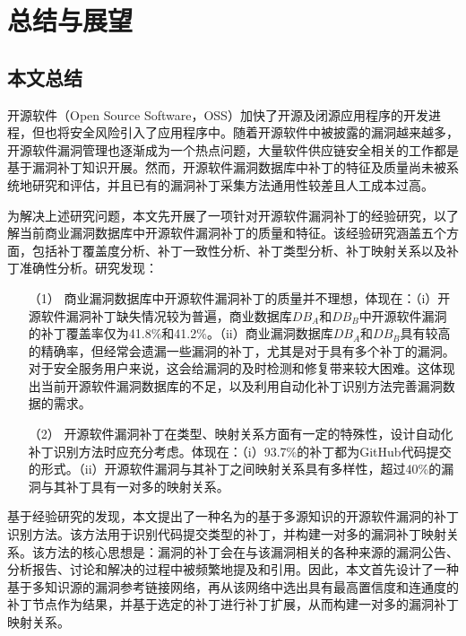 \chapter{总结与展望}


\section{本文总结}
开源软件（Open Source Software，OSS）加快了开源及闭源应用程序的开发进程，但也将安全风险引入了应用程序中。随着开源软件中被披露的漏洞越来越多，开源软件漏洞管理也逐渐成为一个热点问题，大量软件供应链安全相关的工作都是基于漏洞补丁知识开展。然而，开源软件漏洞数据库中补丁的特征及质量尚未被系统地研究和评估，并且已有的漏洞补丁采集方法通用性较差且人工成本过高。

为解决上述研究问题，本文先开展了一项针对开源软件漏洞补丁的经验研究，以了解当前商业漏洞数据库中开源软件漏洞补丁的质量和特征。该经验研究涵盖五个方面，包括补丁覆盖度分析、补丁一致性分析、补丁类型分析、补丁映射关系以及补丁准确性分析。研究发现：
\begin{enumerate}
    \item [（1）]商业漏洞数据库中开源软件漏洞补丁的质量并不理想，体现在：（i）开源软件漏洞补丁缺失情况较为普遍，商业数据库$DB_A$和$DB_B$中开源软件漏洞的补丁覆盖率仅为41.8\%和41.2\%。（ii）商业漏洞数据库$DB_A$和$DB_B$具有较高的精确率，但经常会遗漏一些漏洞的补丁，尤其是对于具有多个补丁的漏洞。对于安全服务用户来说，这会给漏洞的及时检测和修复带来较大困难。这体现出当前开源软件漏洞数据库的不足，以及利用自动化补丁识别方法完善漏洞数据的需求。
    \item [（2）]开源软件漏洞补丁在类型、映射关系方面有一定的特殊性，设计自动化补丁识别方法时应充分考虑。体现在：（i）93.7\%的补丁都为GitHub代码提交的形式。（ii）开源软件漏洞与其补丁之间映射关系具有多样性，超过40\%的漏洞与其补丁具有一对多的映射关系。
\end{enumerate}

基于经验研究的发现，本文提出了一种名为\tool 的基于多源知识的开源软件漏洞的补丁识别方法。该方法用于识别代码提交类型的补丁，并构建一对多的漏洞补丁映射关系。该方法的核心思想是：漏洞的补丁会在与该漏洞相关的各种来源的漏洞公告、分析报告、讨论和解决的过程中被频繁地提及和引用。因此，本文首先设计了一种基于多知识源的漏洞参考链接网络，再从该网络中选出具有最高置信度和连通度的补丁节点作为结果，并基于选定的补丁进行补丁扩展，从而构建一对多的漏洞补丁映射关系。

